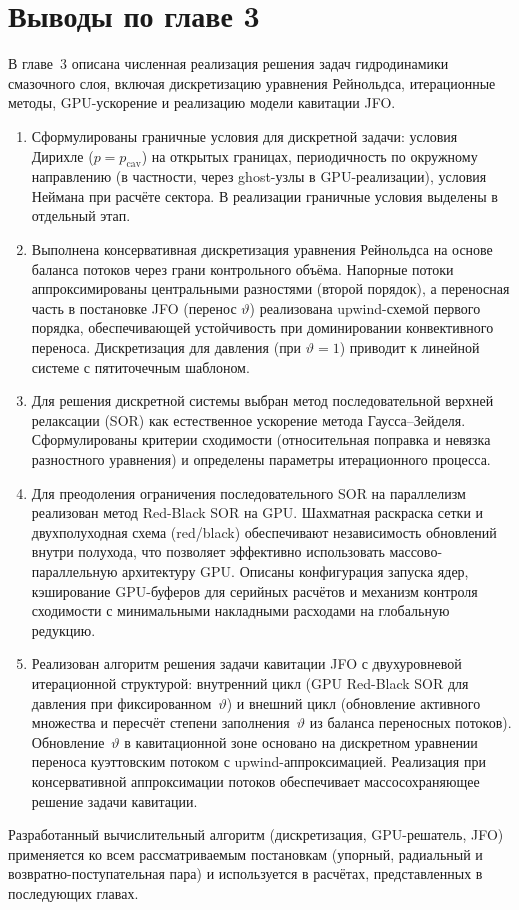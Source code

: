 \FloatBarrier
\section*{Выводы по главе 3}

В главе~3 описана численная реализация решения задач гидродинамики
смазочного слоя, включая дискретизацию уравнения Рейнольдса,
итерационные методы, GPU-ускорение и реализацию модели кавитации JFO.

\begin{enumerate}[wide, labelindent=\parindent, nosep]
  \item Сформулированы граничные условия для дискретной задачи:
    условия Дирихле ($p = p_{\mathrm{cav}}$) на открытых границах,
    периодичность по окружному направлению (в частности, через ghost-узлы
    в GPU-реализации), условия Неймана при расчёте сектора.
    В реализации граничные условия выделены в отдельный этап.
  \item Выполнена консервативная дискретизация уравнения Рейнольдса
    на основе баланса потоков через грани контрольного объёма.
    Напорные потоки аппроксимированы центральными разностями
    (второй порядок), а переносная часть в постановке JFO
    (перенос $\vartheta$) реализована upwind-схемой первого порядка,
    обеспечивающей устойчивость при доминировании конвективного переноса.
    Дискретизация для давления (при $\vartheta=1$) приводит к линейной
    системе с пятиточечным шаблоном.
  \item Для решения дискретной системы выбран метод последовательной
    верхней релаксации (SOR) как естественное ускорение метода
    Гаусса--Зейделя.  Сформулированы критерии сходимости
    (относительная поправка и невязка разностного уравнения)
    и определены параметры итерационного процесса.
  \item Для преодоления ограничения последовательного SOR
    на параллелизм реализован метод Red-Black SOR на GPU.
    Шахматная раскраска сетки и двухполуходная схема (red/black)
    обеспечивают независимость обновлений внутри полухода, что позволяет
    эффективно использовать массово-параллельную архитектуру GPU.
    Описаны конфигурация запуска ядер, кэширование GPU-буферов для серийных
    расчётов и механизм контроля сходимости с минимальными накладными
    расходами на глобальную редукцию.
  \item Реализован алгоритм решения задачи кавитации JFO
    с двухуровневой итерационной структурой: внутренний цикл
    (GPU Red-Black SOR для давления при фиксированном~$\vartheta$)
    и внешний цикл (обновление активного множества и пересчёт степени
    заполнения~$\vartheta$ из баланса переносных потоков).
    Обновление~$\vartheta$ в кавитационной зоне основано на дискретном
    уравнении переноса куэттовским потоком с upwind-аппроксимацией.
    Реализация при консервативной аппроксимации потоков обеспечивает
    массосохраняющее решение задачи кавитации.
\end{enumerate}

Разработанный вычислительный алгоритм (дискретизация, GPU-решатель, JFO)
применяется ко всем рассматриваемым постановкам (упорный, радиальный
и возвратно-поступательная пара) и используется в расчётах,
представленных в последующих главах.

